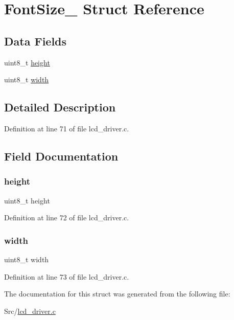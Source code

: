\hypertarget{struct_font_size__}{}\section{Font\+Size\+\_\+ Struct Reference}
\label{struct_font_size__}
\subsection*{Data Fields}
\begin{DoxyCompactItemize}
\item 
uint8\+\_\+t \mbox{\hyperlink{struct_font_size___adcf201a8aabf55cb352ec05331242594}{height}}
\item 
uint8\+\_\+t \mbox{\hyperlink{struct_font_size___a09a2a45f731b02946ff6d3cd15c1a476}{width}}
\end{DoxyCompactItemize}


\subsection{Detailed Description}


Definition at line 71 of file lcd\+\_\+driver.\+c.



\subsection{Field Documentation}
\mbox{\label{struct_font_size___adcf201a8aabf55cb352ec05331242594}} 
\subsubsection{\texorpdfstring{height}{height}}
{\footnotesize\ttfamily uint8\+\_\+t height}



Definition at line 72 of file lcd\+\_\+driver.\+c.

\mbox{\label{struct_font_size___a09a2a45f731b02946ff6d3cd15c1a476}} 
\subsubsection{\texorpdfstring{width}{width}}
{\footnotesize\ttfamily uint8\+\_\+t width}



Definition at line 73 of file lcd\+\_\+driver.\+c.



The documentation for this struct was generated from the following file\+:\begin{DoxyCompactItemize}
\item 
Src/\mbox{\hyperlink{lcd__driver_8c}{lcd\+\_\+driver.\+c}}\end{DoxyCompactItemize}
